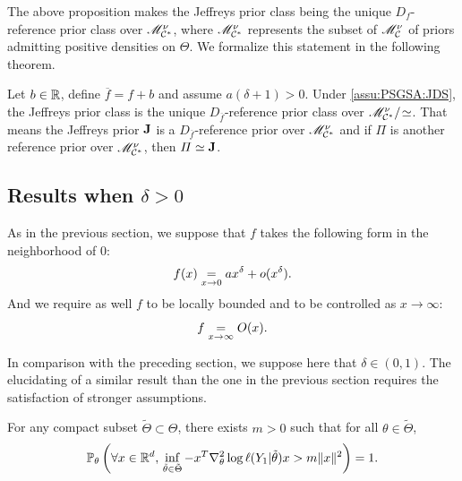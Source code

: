 The above proposition makes the Jeffreys prior class being the unique $D_f$-reference prior class over $\mathscr{M}^\nu_{\mathcal{C}^\ast}$, where $\mathscr{M}^\nu_{\mathcal{C}^\ast}$ represents the subset of $\mathscr{M}_{\mathcal{C}}^\nu$ of priors admitting positive densities on $\Theta$. We
 formalize this statement in the following theorem.



\begin{thm}\label{thm:PSGSA:Jrefdeltaneg}
    Let $b\in\mathbb{R}$, define $\overline{f}=f+b$ and assume $a(\delta+1)>0$.
    Under \cref{assu:PSGSA:JDS}, the Jeffreys prior class is the unique $D_{\overline f}$-reference prior class over $\mathscr{M}^\nu_{\mathcal{C}^\ast}/\!\simeq$.
    That means the Jeffreys prior $\mathbf{J}$ is a $D_{\overline f}$-reference prior over $\mathscr{M}^\nu_{\mathcal{C}^\ast}$ and if $\varPi$ is another reference prior over $\mathscr{M}^\nu_{\mathcal{C}^\ast}$, then $\varPi\simeq\mathbf{J}$.
\end{thm}



\subsection{Results when $\delta>0$}


As in the previous section, we suppose that $f$ takes the following form in the neighborhood of $0$:
\begin{equation}
    f(x) \overset{}{\underset{x\rightarrow0}{=}} a x^\delta + o(x^\delta).
\end{equation}
And we require as well $f$ to be locally bounded and to be controlled as $x\to\infty$: 
\begin{equation}
f\overset{}{\underset{x\rightarrow\infty}{=}}O(x).
\end{equation}

In comparison with the preceding section, we suppose here that $\delta\in(0,1)$.
The elucidating of a similar result than the one in the previous section requires the satisfaction of stronger assumptions.




\begin{assu}\label{assu:infeighes}
    For any compact subset $\tilde\Theta\subset\Theta$,
    there exists $m>0$ such that for all $\theta\in\tilde\Theta$,
    \begin{equation}
        \mathbb{P}_\theta\left(\forall x\in\mathbb{R}^d,\, \inf_{\tilde\theta\in\tilde\Theta}-x^T\nabla_\theta^2\log\ell(Y_1|\tilde\theta)x>m\|x\|^2 \right) = 1.     
    \end{equation}
\end{assu}




